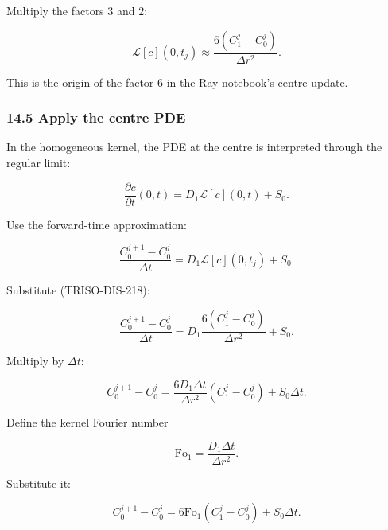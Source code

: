 \documentclass[11pt,a4paper]{article}
\begin{document}
Multiply the factors $3$ and $2$:

\begin{equation}
\boxed{
\mathcal L[c](0,t_j)
\approx
\frac{
6(C_1^j-C_0^j)
}{
\Delta r^2
}.
}
\tag{TRISO-DIS-218}
\label{eq:triso-dis-218}
\end{equation}

This is the origin of the factor $6$ in the Ray notebook's centre update.

\subsubsection*{14.5 Apply the centre PDE}

In the homogeneous kernel, the PDE at the centre is interpreted through the regular limit:

\begin{equation}
\frac{\partial c}{\partial t}(0,t)
=
D_1\mathcal L[c](0,t)
+
S_0.
\tag{TRISO-DIS-219}
\label{eq:triso-dis-219}
\end{equation}

Use the forward-time approximation:

\begin{equation}
\frac{
C_0^{j+1}-C_0^j
}{
\Delta t
}
=
D_1\mathcal L[c](0,t_j)
+
S_0.
\tag{TRISO-DIS-220}
\label{eq:triso-dis-220}
\end{equation}

Substitute (TRISO-DIS-218):

\begin{equation}
\frac{
C_0^{j+1}-C_0^j
}{
\Delta t
}
=
D_1
\frac{
6(C_1^j-C_0^j)
}{
\Delta r^2
}
+
S_0.
\tag{TRISO-DIS-221}
\label{eq:triso-dis-221}
\end{equation}

Multiply by $\Delta t$:

\begin{equation}
C_0^{j+1}-C_0^j
=
\frac{
6D_1\Delta t
}{
\Delta r^2
}
(C_1^j-C_0^j)
+
S_0\Delta t.
\tag{TRISO-DIS-222}
\label{eq:triso-dis-222}
\end{equation}

Define the kernel Fourier number

\begin{equation}
\boxed{
\mathrm{Fo}_1
=
\frac{D_1\Delta t}{\Delta r^2}.
}
\tag{TRISO-DIS-223}
\label{eq:triso-dis-223}
\end{equation}

Substitute it:

\begin{equation}
C_0^{j+1}-C_0^j
=
6\mathrm{Fo}_1
(C_1^j-C_0^j)
+
S_0\Delta t.
\tag{TRISO-DIS-224}
\label{eq:triso-dis-224}
\end{equation}
\end{document}
